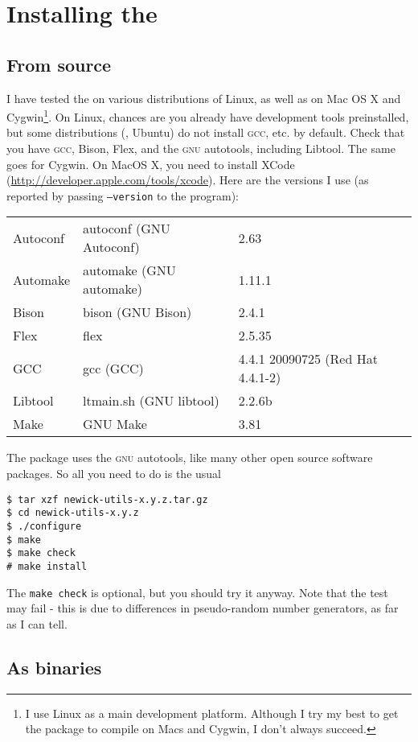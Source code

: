 \chapter{Installing the \nutils}

\section{From source}

I have tested the \nutils{} on various distributions of Linux, as well as on
Mac OS X and Cygwin\footnote{I use Linux as a main development platform.
Although I try my best to get the package to compile on Macs and Cygwin, I don't
always succeed.}. On Linux, chances are you already have development tools
preinstalled, but some distributions (\eg, Ubuntu) do not install \textsc{gcc},
etc. by default. Check that you have \textsc{gcc}, Bison, Flex, and the
\textsc{gnu} autotools, including Libtool. The same goes for Cygwin. On MacOS X,
you need to install XCode (\url{http://developer.apple.com/tools/xcode}).
Here are the versions I use (as reported by passing \texttt{--version} to the
program):

\medskip
\begin{tabular}{lll}
Autoconf	& autoconf (GNU Autoconf) & 2.63 \\
Automake	& automake (GNU automake) & 1.11.1 \\
Bison  		& bison (GNU Bison) 			& 2.4.1 \\ 
Flex			& flex 										& 2.5.35 \\
GCC 			& gcc (GCC) 							& 4.4.1 20090725 (Red Hat 4.4.1-2) \\
Libtool		& ltmain.sh (GNU libtool) & 2.2.6b \\
Make			& GNU Make 								& 3.81
\end{tabular}
\medskip

\noindent{}The package uses the \textsc{gnu} autotools, like many other open source
software packages. So all you need to do is the usual
\begin{verbatim}
$ tar xzf newick-utils-x.y.z.tar.gz
$ cd newick-utils-x.y.z
$ ./configure
$ make
$ make check
# make install
\end{verbatim}
The \texttt{make check} is optional, but you should try it anyway. Note that
the \gen{} test may fail - this is due to differences in pseudo-random number
generators, as far as I can tell.


\section{As binaries}


